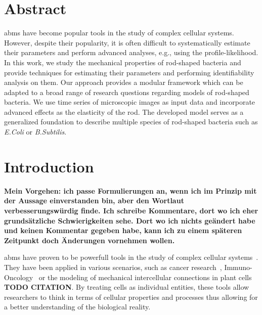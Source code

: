 \documentclass[10pt,letterpaper]{article}
\begin{document}
\section*{Abstract}
\aclp{abm} have become popular tools in the study of complex cellular systems.
However, despite their popularity, it is often difficult to systematically estimate their
parameters and perform advanced analyses, e.g., using the profile-likelihood.
In this work, we study the mechanical properties of rod-shaped bacteria and provide techniques
for estimating their parameters and performing identifiability analysis on them.
Our approach provides a modular framework which can be adapted to a broad range of research
questions regarding models of rod-shaped bacteria.
We use time series of microscopic images as input data and incorporate advanced effects as the
elasticity of the rod.
The developed model serves as a generalized foundation to describe multiple species of
rod-shaped bacteria such as \textit{E.Coli} or \textit{B.Subtilis}.


\pagebreak
\renewcommand{\contentsname}{Table of Contents (remove before submission)}
\tableofcontents
\vfill
\pagebreak

\section{Introduction}
\textbf{
    Mein Vorgehen: ich passe Formulierungen an, wenn ich im Prinzip mit der Aussage einverstanden
    bin, aber den Wortlaut verbesserungswürdig finde.
    Ich schreibe Kommentare, dort wo ich eher grundsätzliche Schwierigkeiten sehe.
    Dort wo ich nichts geändert habe und keinen Kommentar gegeben habe, kann ich zu einem späteren
    Zeitpunkt doch Änderungen vornehmen wollen.
}

\acp{abm} have proven to be powerfull tools in the study of complex cellular
systems~\cite{Pleyer2023}.
They have been applied in various scenarios, such as cancer
research~\cite{Ghaffarizadeh2018,Cooper2020}, Immuno-Oncology~\cite{Karolak2021} or the modeling
of mechanical intercellular connections in plant cells \textbf{TODO CITATION}.
By treating cells as individual entities, these tools allow researchers to think in terms of
cellular properties and processes thus allowing for a better understanding of the biological
reality.
\end{document}
